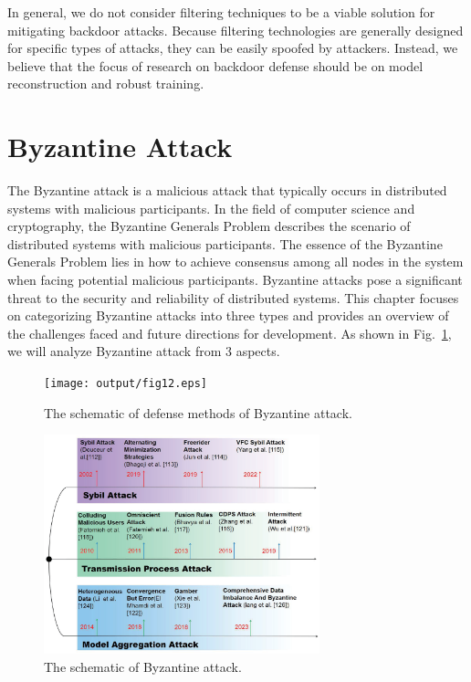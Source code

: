 \documentclass[pdflatex,sn-mathphys-num]{sn-jnl}%
\theoremstyle{thmstyleone}%
\theoremstyle{thmstyletwo}%
\theoremstyle{thmstylethree}%
\begin{document}
In general, we do not consider filtering techniques to be
a viable solution for mitigating backdoor attacks. Because
filtering technologies are generally designed for specific
types of attacks, they can be easily spoofed by attackers.
Instead, we believe that the focus of research on backdoor
defense should be on model reconstruction and robust
training.


\section{Byzantine Attack}
The Byzantine attack is a malicious attack that
typically occurs in distributed systems with malicious
participants. In the field of computer science and cryptography,
the Byzantine Generals Problem describes the scenario
of distributed systems with malicious participants. The
essence of the Byzantine Generals Problem lies in how
to achieve consensus among all nodes in the system
when facing potential malicious participants. Byzantine
attacks pose a significant threat to the security and
reliability of distributed systems. This chapter focuses
on categorizing Byzantine attacks into three types and
provides an overview of the challenges faced and future
directions for development. As shown in Fig.~\ref{fig13}, we will
analyze Byzantine attack from 3 aspects.

\begin{figure}[htbp]
	\centering
	\begin{minipage}{0.49\linewidth}
		\centering
		\texttt{[image: output/fig12.eps]}
		\caption{The schematic of defense methods of Byzantine attack.}
		\label{fig12}
	\end{minipage}
	\begin{minipage}{0.49\linewidth}
		\centering
		\includegraphics[width=1.0\linewidth,height=2.5in]{output/fig13.eps}
		\caption{The schematic of Byzantine attack.}
		\label{fig13}
	\end{minipage}
\end{figure}
\end{document}

